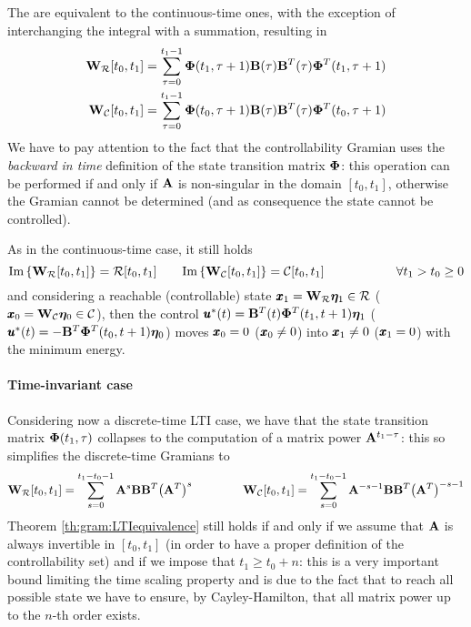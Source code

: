 	The  are equivalent to the continuous-time ones, with the exception of interchanging the integral with a summation, resulting in 
	\begin{equation} 	\begin{split}
		\mathbf{W}_\mathcal R[t_0,t_1] & = \sum_{\tau = 0}^{t_1-1} \mathbf{\Phi}(t_1,\tau+1)\mathbf{B}(\tau)\mathbf{B}^T(\tau) \mathbf{\Phi}^T(t_1,\tau + 1)  \\		 
		\mathbf{W}_\mathcal C[t_0,t_1] & = \sum_{\tau = 0}^{t_1-1} \mathbf{\Phi}(t_0,\tau+1)\mathbf{B}(\tau)\mathbf{B}^T(\tau) \mathbf{\Phi}^T(t_0,\tau + 1)
	\end{split} \end{equation}
	We have to pay attention to the fact that the controllability Gramian uses the \textit{backward in time} definition of the state transition matrix $\mathbf{\Phi}$: this operation can be performed if and only if $\mathbf{A}$ is non-singular in the domain $[t_0,t_1]$, otherwise the Gramian cannot be determined (and as consequence the state cannot be controlled).
	
	As in the continuous-time case, it still holds
	\[ \textrm{Im}\left\{\mathbf{W}_\mathcal R[t_0,t_1]\right\} = \mathcal R[t_0,t_1] \qquad \textrm{Im}\left\{\mathbf{W}_\mathcal C[t_0,t_1]\right\} = \mathcal C[t_0,t_1] \hspace{2cm} \forall t_1> t_0 \geq 0 \]
	and considering a reachable (controllable) state $\pmb{x}_1 = \mathbf{W}_\mathcal R \boldsymbol{\eta}_1 \in \mathcal R$ ($\pmb{x}_0 = \mathbf{W}_\mathcal C \boldsymbol{\eta}_0 \in \mathcal C$), then the control $\pmb{u}^*(t) = \mathbf{B}^T(t) \mathbf{\Phi}^T(t_1,t+1) \boldsymbol{\eta}_1$ ($\pmb{u}^*(t) = - \mathbf{B}^T \mathbf{\Phi}^T(t_0,t+1)\boldsymbol{\eta}_0$) moves $\pmb{x}_0=0$ ($\pmb{x}_0\neq 0$) into $\pmb{x}_1 \neq 0$ ($\pmb{x}_1 = 0$) with the minimum energy.
	
	\paragraph{Time-invariant case} Considering now a discrete-time LTI case, we have that the state transition matrix $\mathbf{\Phi}(t_1,\tau)$ collapses to the computation of a matrix power $\mathbf{A}^{t_1-\tau}$: this so simplifies the discrete-time Gramians to
	\begin{equation}
		\mathbf{W}_\mathcal R[t_0,t_1] = \sum_{s=0}^{t_1-t_0-1} \mathbf{A}^s \mathbf{B}\mathbf{B}^T \big(\mathbf{A}^T\big)^s \hspace{1.5cm} \mathbf{W}_\mathcal C[t_0,t_1] = \sum_{s=0}^{t_1-t_0-1} \mathbf{A}^{-s-1} \mathbf{B}\mathbf{B}^T \big(\mathbf{A}^T\big)^{-s-1}
	\end{equation}
	Theorem \ref{th:gram:LTIequivalence} still holds if and only if we assume that $\mathbf{A}$ is always invertible in $[t_0,t_1]$ (in order to have a proper definition of the controllability set) and if we impose that $t_1 \geq t_0 + n$: this is a very important bound limiting the time scaling property and is due to the fact that to reach all possible state we have to ensure, by Cayley-Hamilton, that all matrix power up to the $n$-th order exists.
	

